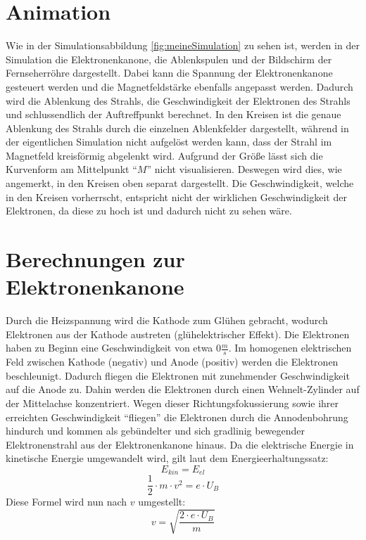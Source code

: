 \section{Animation}
Wie in der Simulationsabbildung \ref{fig:meineSimulation} zu sehen ist, werden in der Simulation die Elektronenkanone, die Ablenkspulen und der Bildschirm der Fernseherröhre dargestellt. 
Dabei kann die Spannung der Elektronenkanone gesteuert werden und die Magnetfeldstärke ebenfalls angepasst werden.
Dadurch wird die Ablenkung des Strahls, die Geschwindigkeit der Elektronen des Strahls und schlussendlich der Auftreffpunkt berechnet.
In den Kreisen ist die genaue Ablenkung des Strahls durch die einzelnen Ablenkfelder dargestellt, während in der eigentlichen Simulation nicht aufgelöst werden kann, dass der Strahl im Magnetfeld kreisförmig abgelenkt wird.
Aufgrund der Größe lässt sich die Kurvenform am Mittelpunkt "`$M$"' nicht visualisieren.
Deswegen wird dies, wie angemerkt, in den Kreisen oben separat dargestellt.
Die Geschwindigkeit, welche in den Kreisen vorherrscht, entspricht nicht der wirklichen Geschwindigkeit der Elektronen, da diese zu hoch ist und dadurch nicht zu sehen wäre.
\label{sec:animation}

\section{Berechnungen zur Elektronenkanone}

\label{sec:tolle-section}
 
Durch die Heizspannung wird die Kathode zum Glühen gebracht, wodurch Elektronen aus der Kathode austreten (glühelektrischer Effekt).
Die Elektronen haben zu Beginn eine Geschwindigkeit von etwa $0 \frac{m}{s}$.
Im homogenen elektrischen Feld zwischen Kathode (negativ) und Anode (positiv) werden die Elektronen beschleunigt.
Dadurch fliegen die Elektronen mit zunehmender Geschwindigkeit auf die Anode zu.
Dahin werden die Elektronen durch einen Wehnelt-Zylinder auf der Mittelachse konzentriert.
Wegen dieser Richtungsfokussierung sowie ihrer erreichten Geschwindigkeit "`fliegen"' die Elektronen durch die Annodenbohrung hindurch und kommen als gebündelter und sich gradlinig bewegender Elektronenstrahl aus der Elektronenkanone hinaus.
Da die elektrische Energie in kinetische Energie umgewandelt wird, gilt laut dem Energieerhaltungssatz:
\begin{equation}
\label{eq:Energie}
   E_{kin} = E_{el}  
\end{equation}
$$ \frac{1}{2} \cdot m \cdot v^2 = e \cdot U_B$$
Diese Formel wird  nun nach $v$ umgestellt:
\begin{equation}
\label{eq:v}
   v = \sqrt{\frac{2 \cdot e \cdot U_B}{m}} 
\end{equation}


